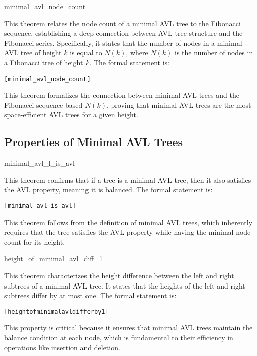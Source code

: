     \begin{thm}{minimal\_avl\_node\_count}

    This theorem relates the node count of a minimal AVL tree to the Fibonacci sequence, establishing a deep connection between AVL tree structure and the Fibonacci series. Specifically, it states that the number of nodes in a minimal AVL tree of height \( k \) is equal to \( N(k) \), where \( N(k) \) is the number of nodes in a Fibonacci tree of height \( k \). The formal statement is:
    
    \begin{alltt}
    	[minimal_avl_node_count]
    \end{alltt}
    
    
    \end{thm}
    This theorem formalizes the connection between minimal AVL trees and the Fibonacci sequence-based \( N(k) \), proving that minimal AVL trees are the most space-efficient AVL trees for a given height.
    

    \subsection{Properties of Minimal AVL Trees}
	
	\begin{thm}{minimal\_avl\_l\_is\_avl}

    This theorem confirms that if a tree is a minimal AVL tree, then it also satisfies the AVL property, meaning it is balanced. The formal statement is:

    \begin{alltt}
    	[minimal_avl_is_avl]
    \end{alltt}
    
    \end{thm}
    This theorem follows from the definition of minimal AVL trees, which inherently requires that the tree satisfies the AVL property while having the minimal node count for its height.


    \begin{thm}{height\_of\_minimal\_avl\_diff\_1}

    This theorem characterizes the height difference between the left and right subtrees of a minimal AVL tree. It states that the heights of the left and right subtrees differ by at most one. The formal statement is:
    
    \begin{alltt}
    	[height of minimal avl differ by 1]
    \end{alltt}
    
    
    \end{thm}
    This property is critical because it ensures that minimal AVL trees maintain the balance condition at each node, which is fundamental to their efficiency in operations like insertion and deletion.


